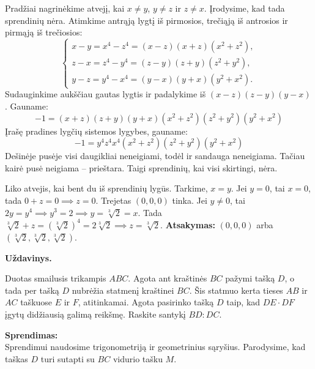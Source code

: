 \documentclass[11pt, a4paper]{scrreprt}
\newenvironment{problem}
    {\par\medskip\noindent\textbf{Uždavinys.}\par\smallskip}
    {\par\medskip}
\begin{document}
\begin{soln}
Pradžiai nagrinėkime atvejį, kai $x \ne y$, $y \ne z$ ir $z \ne x$. Įrodysime, kad tada sprendinių nėra.
Atimkime antrąją lygtį iš pirmosios, trečiąją iš antrosios ir pirmąją iš trečiosios:
\begin{equation*}
\begin{cases}
x-y = x^4 - z^4 = (x-z)(x+z)(x^2+z^2), \\
z-x = z^4 - y^4 = (z-y)(z+y)(z^2+y^2), \\
y-z = y^4 - x^4 = (y-x)(y+x)(y^2+x^2).
\end{cases}
\end{equation*}
Sudauginkime aukščiau gautas lygtis ir padalykime iš $(x-z)(z-y)(y-x)$. Gauname:
\begin{equation*}
-1 = (x+z)(z+y)(y+x)(x^2+z^2)(z^2+y^2)(y^2+x^2)
\end{equation*}
Įrašę pradines lygčių sistemos lygybes, gauname:
\begin{equation*}
-1 = y^4 z^4 x^4 (x^2+z^2)(z^2+y^2)(y^2+x^2)
\end{equation*}
Dešinėje pusėje visi daugikliai neneigiami, todėl ir sandauga neneigiama. Tačiau kairė pusė neigiama – prieštara. Taigi sprendinių, kai visi skirtingi, nėra.

Liko atvejis, kai bent du iš sprendinių lygūs. Tarkime, $x=y$.
Jei $y=0$, tai $x=0$, tada $0+z=0 \implies z=0$. Trejetas $(0,0,0)$ tinka.
Jei $y \ne 0$, tai $2y = y^4 \implies y^3 = 2 \implies y = \sqrt[3]{2} = x$.
Tada $\sqrt[3]{2} + z = (\sqrt[3]{2})^4 = 2\sqrt[3]{2} \implies z = \sqrt[3]{2}$. 
\textbf{Atsakymas:} $(0,0,0)$ arba $(\sqrt[3]{2}, \sqrt[3]{2}, \sqrt[3]{2})$.
\end{soln}

\vspace{1cm}

\begin{problem}
Duotas smailusis trikampis $ABC$. Agota ant kraštinės $BC$ pažymi tašką $D$, o tada per tašką $D$ nubrėžia statmenį kraštinei $BC$. Šis statmuo kerta tieses $AB$ ir $AC$ taškuose $E$ ir $F$, atitinkamai. Agota pasirinko tašką $D$ taip, kad $DE \cdot DF$ įgytų didžiausią galimą reikšmę. Raskite santykį $BD : DC$.
\end{problem}

\textbf{Sprendimas:}\\
Sprendimui naudosime trigonometriją ir geometrinius sąryšius. Parodysime, kad taškas $D$ turi sutapti su $BC$ vidurio tašku $M$.
\end{document}
